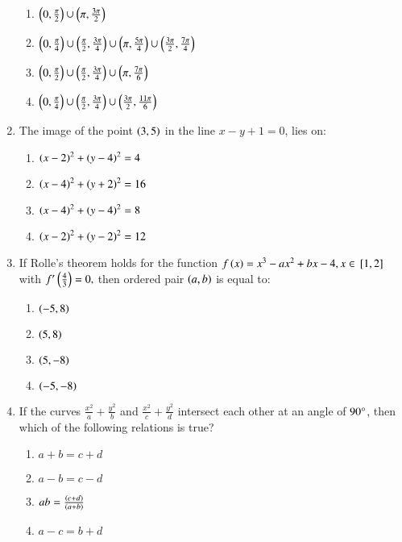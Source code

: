 \documentclass[journal,12pt,twocolumn]{IEEEtran}
\theoremstyle{remark}
\begin{document}
\begin{enumerate}
\begin{enumerate}
    \item $\left(0,\frac{\pi}{2}\right)\cup\left(\pi,\frac{3\pi}{2}\right)$
    \item $\left(0,\frac{\pi}{4}\right)\cup\left(\frac{\pi}{2},\frac{3\pi}{4}\right)\cup\left(\pi,\frac{5\pi}{4}\right)\cup\left(\frac{3\pi}{2},\frac{7\pi}{4}\right)$
    \item $\left(0,\frac{\pi}{2}\right)\cup\left(\frac{\pi}{2},\frac{3\pi}{4}\right)\cup\left(\pi,\frac{7\pi}{6}\right)$
    \item $\left(0,\frac{\pi}{4}\right)\cup\left(\frac{\pi}{2},\frac{3\pi}{4}\right)\cup\left(\frac{3\pi}{2},\frac{11\pi}{6}\right)$
\end{enumerate}
\item The image of the point $\left(3,5\right)$ in the line $x-y+1=0$, lies on$\colon$
\begin{enumerate}
    \item $\left(x-2\right)^{2}+\left(y-4\right)^{2}=4$
    \item $\left(x-4\right)^{2}+\left(y+2\right)^{2}=16$
    \item $\left(x-4\right)^{2}+\left(y-4\right)^{2}=8$
    \item $\left(x-2\right)^{2}+\left(y-2\right)^{2}=12$
\end{enumerate}
\item If Rolle's theorem holds for the function $f\left(x\right)=x^{3}-ax^{2}+bx-4, x \in {}\left[1,2\right]$ with $f^{\prime}\left(\frac{4}{3}\right)=0,$ then ordered pair $\left(a,b\right)$ is equal to$\colon$
\begin{enumerate}
    \item $\left(-5,8\right)$
    \item $\left(5,8\right)$
    \item $\left(5,-8\right)$
    \item $\left(-5,-8\right)$
\end{enumerate}
\item If the curves $\frac{x^{2}}{a}+\frac{y^{2}}{b}$ and $\frac{x^{2}}{c}+\frac{y^{2}}{d}$ intersect each other at an angle of $90\degree$, then which of the following relations is true?
\begin{enumerate}
    \item $a+b=c+d$
    \item $a-b=c-d$
    \item $ab=\frac{\left(c+d\right)}{\left(a+b\right)}$
    \item $a-c=b+d$
\end{enumerate}
\end{enumerate}
\end{document}

